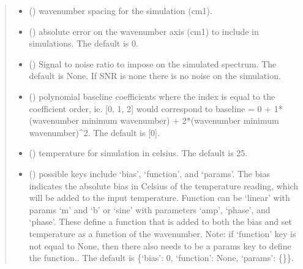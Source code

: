 \documentclass[letterpaper,10pt,english]{sphinxmanual}
\begin{document}
\begin{fulllineitems}
\begin{quote}
\begin{description}
\begin{itemize}
\item {} 
\sphinxAtStartPar
{} (\sphinxstyleliteralemphasis{\sphinxupquote{, }}) \textendash{} wavenumber spacing for the simulation (cm\sphinxhyphen{}1).

\item {} 
\sphinxAtStartPar
{} (\sphinxstyleliteralemphasis{\sphinxupquote{, }}) \textendash{} absolute error on the wavenumber axis (cm\sphinxhyphen{}1) to include in simulations. The default is 0.

\item {} 
\sphinxAtStartPar
{} (\sphinxstyleliteralemphasis{\sphinxupquote{, }}) \textendash{} Signal to noise ratio to impose on the simulated spectrum. The default is None.  If SNR is none there is no noise on the simulation.

\item {} 
\sphinxAtStartPar
{} (\sphinxstyleliteralemphasis{\sphinxupquote{, }}) \textendash{} polynomial baseline coefficients where the index is equal to the coefficient order, ie. {[}0, 1, 2{]} would correspond to baseline = 0 + 1*(wavenumber \sphinxhyphen{} minimum wavenumber) + 2*(wavenumber \sphinxhyphen{} minimum wavenumber)\textasciicircum{}2. The default is {[}0{]}.

\item {} 
\sphinxAtStartPar
{} (\sphinxstyleliteralemphasis{\sphinxupquote{, }}) \textendash{} temperature for simulation in celsius. The default is 25.

\item {} 
\sphinxAtStartPar
{} (\sphinxstyleliteralemphasis{\sphinxupquote{, }}) \textendash{} possible keys include ‘bias’, ‘function’, and ‘params’. The bias indicates the absolute bias in Celsius of the temperature reading, which will be added to the input temperature. Function can be ‘linear’ with params ‘m’ and ‘b’ or ‘sine’ with parameters ‘amp’, ‘phase’, and ‘phase’. These define a function that is added to both the bias and set temperature as a function of the wavenumber. Note: if ‘function’ key is not equal to None, then there also needs to be a params key to define the function.. The default is \{‘bias’: 0, ‘function’: None, ‘params’: \{\}\}.


\end{itemize}
\end{description}
\end{quote}
\end{fulllineitems}
\end{document}
